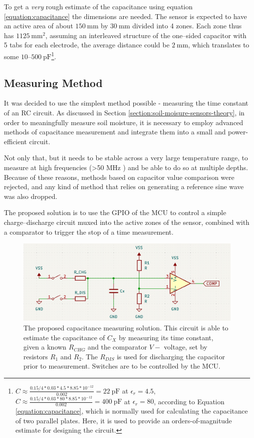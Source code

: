 To get a \emph{very} rough estimate of the capacitance using equation \ref{equation:capacitance} the dimensions are needed. The sensor is expected to have an active area of about $150~\mathrm{mm}$ by $30~\mathrm{mm}$ divided into 4 zones. Each zone thus has $1125~\mathrm{mm^2}$, assuming an interleaved structure of the one--sided capacitor with 5 tabs for each electrode, the average distance could be $2~\mathrm{mm}$, which translates to some $10\text{--}500~\mathrm{pF}$\footnote{$C \approx \frac{0.15/4*0.03*4.5*8.85*10^{-12}}{0.002}=22~\mathrm{pF}$ at $\epsilon_r=4.5$, $C \approx \frac{0.15/4*0.03*80*8.85*10^{-12}}{0.002}=400~\mathrm{pF}$ at $\epsilon_r=80$, according to Equation \ref{equation:capacitance}, which is normally used for calculating the capacitance of two parallel plates. Here, it is used to provide an orders-of-magnitude estimate for designing the circuit.}.

\subsection{\label{section:measuring-method}Measuring Method}
It was decided to use the simplest method possible - measuring the time constant of an RC circuit. As discussed in Section \ref{section:soil-moisure-sensors-theory}, in order to meaningfully measure soil moisture, it is necessary to employ advanced methods of capacitance measurement and integrate them into a small and power-efficient circuit.

Not only that, but it needs to be stable across a very large temperature range, to measure at high frequencies (>50 MHz \cite{meter_group_soil_2023}) and be able to do so at multiple depths. Because of these reasons, methods based on capacitor value comparison were rejected, and any kind of method that relies on generating a reference sine wave was also dropped.

The proposed solution is to use the GPIO of the MCU to control a simple charge--discharge circuit muxed into the active zones of the sensor, combined with a comparator to trigger the stop of a time measurement.

\begin{figure}[H]
    \includegraphics[width=.7\textwidth]{fig/principle-cap-measure.png}
    \caption{\label{fig:principle-cap-measure}The proposed capacitance measuring solution. This circuit is able to estimate the capacitance of $C_X$ by measuring its time constant, given a known $R_{CHG}$ and the comparator $V-$ voltage, set by resistors $R_1$ and $R_2$. The $R_{DIS}$ is used for discharging the capacitor prior to measurement. Switches are to be controlled by the MCU.}
\end{figure}

